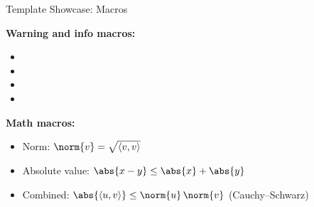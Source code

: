 \blueheader
\begin{frame}{Template Showcase: Macros}

\textbf{Warning and info macros:}
\medskip
\begin{itemize}
  \item \warn
  \item \info
  \item {}
  \item {}
\end{itemize}

\medskip
\textbf{Math macros:}
\medskip
\begin{itemize}
  \item Norm: $\norm{v} = \sqrt{\langle v, v \rangle}$
  \item Absolute value: $\abs{x - y} \leq \abs{x} + \abs{y}$
  \item Combined: $\abs{\langle u, v \rangle} \leq \norm{u}\,\norm{v}$ \quad (Cauchy--Schwarz)
\end{itemize}

\end{frame}
